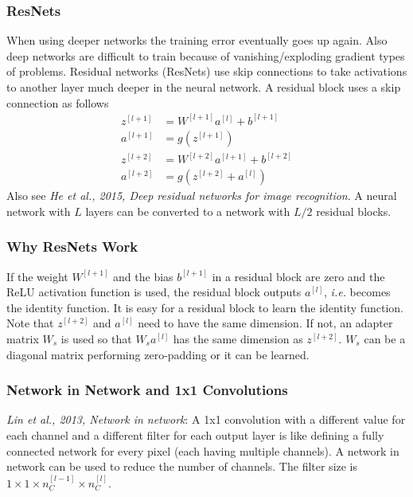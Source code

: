 \documentclass{article}
\begin{document}
\subsubsection{ResNets}
When using deeper networks the training error eventually goes up again.
Also deep networks are difficult to train because of vanishing/exploding gradient types of problems.
Residual networks (ResNets) use skip connections to take activations to another layer much deeper in the neural network.
A residual block uses a skip connection as follows
\begin{equation}
  \begin{split}
    z^{[l+1]}&=W^{[l+1]}a^{[l]}+b^{[l+1]}\\
    a^{[l+1]}&=g(z^{[l+1]})\\
    z^{[l+2]}&=W^{[l+2]}a^{[l+1]}+b^{[l+2]}\\
    a^{[l+2]}&=g(z^{[l+2]}+a^{[l]})
  \end{split}
\end{equation}
Also see \emph{He et al., 2015, Deep residual networks for image recognition}.
A neural network with $L$ layers can be converted to a network with $L/2$ residual blocks.

\subsubsection{Why ResNets Work}
If the weight $W^{[l+1]}$ and the bias $b^{[l+1]}$ in a residual block are zero and the ReLU activation function is used,
the residual block outputs $a^{[l]}$, \emph{i.e.} becomes the identity function.
It is easy for a residual block to learn the identity function.
Note that $z^{[l+2]}$ and $a^{[l]}$ need to have the same dimension.
If not, an adapter matrix $W_s$ is used so that $W_s a^{[l]}$ has the same dimension as $z^{[l+2]}$.
$W_s$ can be a diagonal matrix performing zero-padding or it can be learned.

\subsubsection{Network in Network and 1x1 Convolutions}
\emph{Lin et al., 2013, Network in network}:
A 1x1 convolution with a different value for each channel and a different filter for each output layer
is like defining a fully connected network for every pixel (each having multiple channels).
A network in network can be used to reduce the number of channels.
The filter size is $1\times 1\times n^{[l-1]}_C\times n^{[l]}_C$.
\end{document}
